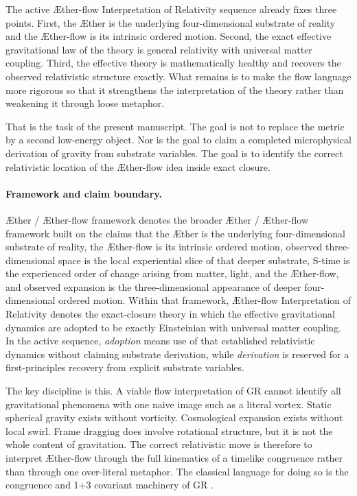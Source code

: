 \documentclass[11pt]{article}
\newcommand{\Aether}{\AE{}ther}
\newcommand{\Aflow}{\AE{}ther-flow}
\newcommand{\TheoryName}{\Aflow{} Interpretation of Relativity}
\newcommand{\TheoryProgram}{\Aether{} / \Aflow{} framework}
\begin{document}
The active \TheoryName{} sequence already fixes three points. First, the \Aether{} is the underlying four-dimensional substrate of reality and the \Aflow{} is its intrinsic ordered motion. Second, the exact effective gravitational law of the theory is general relativity with universal matter coupling. Third, the effective theory is mathematically healthy and recovers the observed relativistic structure exactly. What remains is to make the flow language more rigorous so that it strengthens the interpretation of the theory rather than weakening it through loose metaphor.

That is the task of the present manuscript. The goal is not to replace the metric by a second low-energy object. Nor is the goal to claim a completed microphysical derivation of gravity from substrate variables. The goal is to identify the correct relativistic location of the \Aflow{} idea inside exact closure.

\paragraph{Framework and claim boundary.}
\TheoryProgram{} denotes the broader \Aether{} / \Aflow{} framework built on the claims that the \Aether{} is the underlying four-dimensional substrate of reality, the \Aflow{} is its intrinsic ordered motion, observed three-dimensional space is the local experiential slice of that deeper substrate, S-time is the experienced order of change arising from matter, light, and the \Aflow{}, and observed expansion is the three-dimensional appearance of deeper four-dimensional ordered motion. Within that framework, \TheoryName{} denotes the exact-closure theory in which the effective gravitational dynamics are adopted to be exactly Einsteinian with universal matter coupling. In the active sequence, \emph{adoption} means use of that established relativistic dynamics without claiming substrate derivation, while \emph{derivation} is reserved for a first-principles recovery from explicit substrate variables.

The key discipline is this. A viable flow interpretation of GR cannot identify all gravitational phenomena with one naive image such as a literal vortex. Static spherical gravity exists without vorticity. Cosmological expansion exists without local swirl. Frame dragging does involve rotational structure, but it is not the whole content of gravitation. The correct relativistic move is therefore to interpret \Aflow{} through the full kinematics of a timelike congruence rather than through one over-literal metaphor. The classical language for doing so is the congruence and 1+3 covariant machinery of GR \cite{Raychaudhuri1955,EllisVanElst1999}.
\end{document}
